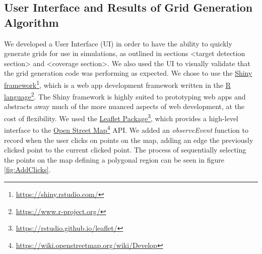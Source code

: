 \subsection{User Interface and Results of Grid Generation Algorithm}
We developed a User Interface (UI) in order to have the ability to quickly generate grids for use in simulations, as outlined in sections <target detection section> and <coverage section>. We also used the UI to visually validate that the grid generation code was performing as expected. We chose to use the  \href{https://shiny.rstudio.com/}{Shiny framework}\footnote{\href {https://shiny.rstudio.com/}{https://shiny.rstudio.com/}}, which is a web app development framework written in the \href{https://www.r-project.org/}{R language}\footnote{\href {https://www.r-project.org/}{https://www.r-project.org/}}. The Shiny framework is highly suited to prototyping web apps and abstracts away much of the more nuanced aspects of web development, at the cost of flexibility. We used the \href{https://rstudio.github.io/leaflet/}{Leaflet Package}\footnote{\href {https://rstudio.github.io/leaflet/}{https://rstudio.github.io/leaflet/}}, which provides a high-level interface to the \href{https://wiki.openstreetmap.org/wiki/Develop}{Open Street Map}\footnote{\href {https://wiki.openstreetmap.org/wiki/Develop}{https://wiki.openstreetmap.org/wiki/Develop}} API. We added an \textit{observeEvent} function to record when the user clicks on points on the map, adding an edge the previously clicked point to the current clicked point. The process of sequentially selecting the points on the map defining a polygonal region can be seen in figure \ref{fig:AddClicks}. 

